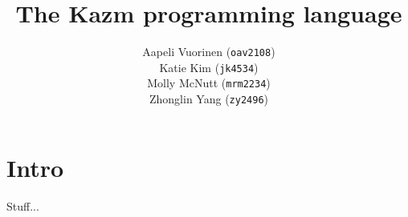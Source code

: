 
\title{The Kazm programming language}
\author{
Aapeli Vuorinen ({\tt oav2108})\\
Katie Kim ({\tt jk4534})\\
Molly McNutt ({\tt mrm2234})\\
Zhonglin Yang  ({\tt zy2496})
}

\maketitle

\section{Intro}

Stuff...


